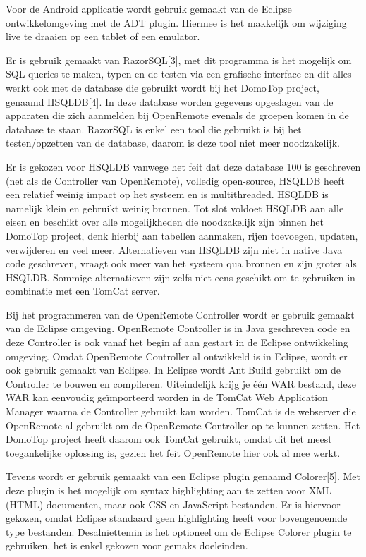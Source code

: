 \documentclass{article}
\begin{document}
Voor de Android applicatie wordt gebruik gemaakt van de Eclipse
ontwikkelomgeving met de ADT plugin. Hiermee is het makkelijk om wijziging
live te draaien op een tablet of een emulator.

Er is gebruik gemaakt van RazorSQL[3], met dit programma is het mogelijk om
SQL queries te maken, typen en de testen via een grafische interface en dit
alles werkt ook met de database die gebruikt wordt bij het DomoTop project,
genaamd HSQLDB[4]. In deze database worden gegevens opgeslagen van de
apparaten die zich aanmelden bij OpenRemote evenals de groepen komen in de
database te staan.  RazorSQL is enkel een tool die gebruikt is bij het
testen/opzetten van de database, daarom is deze tool niet meer
noodzakelijk.

Er is gekozen voor HSQLDB vanwege het feit dat deze database 100%
is geschreven (net als de Controller van OpenRemote), volledig open-source,
HSQLDB heeft een relatief weinig impact op het systeem en is multithreaded.
HSQLDB is namelijk klein en gebruikt weinig bronnen. Tot slot voldoet
HSQLDB aan alle eisen en beschikt over alle mogelijkheden die noodzakelijk
zijn binnen het DomoTop project, denk hierbij aan tabellen aanmaken, rijen
toevoegen, updaten, verwijderen en veel meer. Alternatieven van HSQLDB zijn
niet in native Java code geschreven,  vraagt ook meer van het systeem qua
bronnen en zijn groter als HSQLDB. Sommige alternatieven zijn zelfs niet
eens geschikt om te gebruiken in combinatie met een TomCat server.

Bij het programmeren van de OpenRemote Controller wordt er gebruik gemaakt
van de Eclipse omgeving. OpenRemote Controller is in Java geschreven code
en deze Controller is ook vanaf het begin af aan gestart in de Eclipse
ontwikkeling omgeving. Omdat OpenRemote Controller al ontwikkeld is in
Eclipse, wordt er ook gebruik gemaakt van Eclipse. In Eclipse wordt Ant
Build gebruikt om de Controller te bouwen en compileren. Uiteindelijk krijg
je één WAR bestand, deze WAR kan eenvoudig geïmporteerd worden in de TomCat
Web Application Manager waarna de Controller gebruikt kan worden. TomCat is
de webserver die OpenRemote al gebruikt om de OpenRemote Controller op te
kunnen zetten. Het DomoTop project heeft daarom ook TomCat gebruikt, omdat
dit het meest toegankelijke oplossing is, gezien het feit OpenRemote hier
ook al mee werkt.

Tevens wordt er gebruik gemaakt van een Eclipse plugin genaamd Colorer[5].
Met deze plugin is het mogelijk om syntax highlighting aan te zetten voor
XML (HTML) documenten, maar ook CSS en JavaScript bestanden. Er is hiervoor
gekozen, omdat Eclipse standaard geen highlighting heeft voor bovengenoemde
type bestanden. Desalniettemin is het optioneel om de Eclipse Colorer
plugin te gebruiken, het is enkel gekozen voor gemaks doeleinden.
\end{document}
